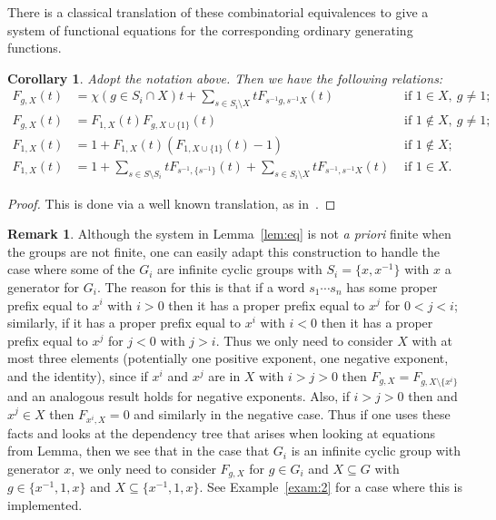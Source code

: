 \documentclass[11pt]{amsart}
\newtheorem{corollary}[theorem]{Corollary}
\theoremstyle{definition}
\newtheorem{remark}[theorem]{Remark}
\newcommand{\unone}[1]{#1\cup\{1\}}
\begin{document}
There is a classical translation of these combinatorial
equivalences to give a system of functional equations for the
corresponding ordinary generating functions.
    
\begin{corollary}\label{grammarCorrectness_series}
Adopt the notation above.  Then we have the following relations:
\begin{align}
\label{case_1inX_gnot1_series}
F_{g,X}(t)&=\chi(g\in S_i\cap X)t + \sum_{s\in S_i\setminus X}t
                                    F_{s^{-1}g,s^{-1}X}(t) &\text{ if }1\in X,\ g\neq 1;\\
\label{case_1notinX_gnot1_series}
F_{g,X}(t)&=F_{1,X}(t)F_{g,\unone{X}}(t) &\text{ if }1\notin X,\ g\neq 1;\\
\label{case_1notinX_g1_series}
F_{1,X}(t)&=1+F_{1,X}(t)(F_{1,\unone{X}}(t)-1)&\text{ if }1\notin X;\\
\label{case_1inX_g1_series}
F_{1,X}(t)&=1+\sum_{s\in S\setminus
            S_i}tF_{s^{-1},\{s^{-1}\}}(t)+\sum_{s\in S_i\setminus X} tF_{s^{-1},s^{-1}X}(t)&\text{ if  }1\in X.
\end{align}
\end{corollary}
\begin{proof} This is done via a well known translation, as in~\cite{flajolet}. \end{proof}

\begin{remark}
Although the system in Lemma~\ref{lem:eq} is not \emph{a priori} finite when the groups are not finite, one can easily adapt this construction to handle the case where some of the $G_i$ are infinite cyclic groups with $S_i=\{x,x^{-1}\}$ with $x$ a generator for $G_i$.  The reason for this is that if a word $s_1\cdots s_n$ has some proper prefix equal to $x^i$ with $i>0$ then it has a proper prefix equal to $x^j$ for $0<j<i$; similarly, if it has a proper prefix equal to $x^i$ with $i<0$ then it has a proper prefix equal to $x^j$ for $j<0$ with $j>i$.  Thus we only need to consider $X$ with at most three elements (potentially one positive exponent, one negative exponent, and the identity), since if $x^i$ and $x^j$ are in $X$ with $i>j>0$ then $F_{g,X}=F_{g,X\setminus \{x^i\}}$ and an analogous result holds for negative exponents.  Also, if $i>j>0$ then and $x^j\in X$ then $F_{x^i,X}=0$ and similarly in the negative case.  Thus if one uses these facts and looks at the dependency tree that arises when looking at equations  from Lemma, then we see that in the case that $G_i$ is an infinite cyclic group with generator $x$, we only need to consider $F_{g,X}$ for $g\in G_i$ and $X\subseteq G$ with $g\in \{x^{-1},1,x\}$ and $X\subseteq \{x^{-1},1,x\}$.  See Example~\ref{exam:2} for a case where this is implemented.
\label{rem:infinite}
\end{remark}
\end{document}
